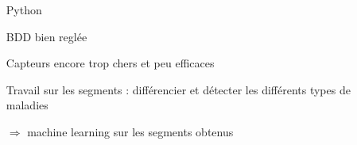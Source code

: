 \documentclass{beamer}
\begin{document}
\begin{frame}

\begin{itemize}

	\item[Python]
	
	\item[BDD] bien reglée
	
	\item[Capteurs] encore trop chers et peu efficaces
	
	\vspace*{1cm}
	\item[Travail] sur les segments : différencier et détecter les différents types de maladies
	\item[$\Longrightarrow$] machine learning sur les segments obtenus
	\vspace*{1cm}

\end{itemize}

\end{frame}
\end{document}
